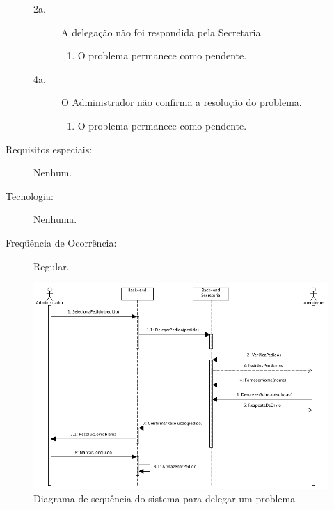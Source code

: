 \documentclass[brazil,times]{abnt}
\begin{document}
\begin{description}
\begin{description}
	\item[2a.] A delegação não foi respondida pela Secretaria.
	\begin{enumerate}
 		\item O problema permanece como pendente.
	\end{enumerate}
		
	\item[4a.] O Administrador não confirma a resolução do problema. 
	\begin{enumerate}
 		\item O problema permanece como pendente.
	\end{enumerate} 
\end{description}
\item[Requisitos especiais:] Nenhum.
\item[Tecnologia:] Nenhuma.
\item[Freqüência de Ocorrência:] Regular.
\end{description}
\newpage
\begin{figure}[htp]
\begin{center}
  \includegraphics[scale=0.65]{diagramas/diagramaDeSequenciaDelegar.png}
  \caption[Diagrama de sequência do sistema para delegar um
  problema]{Diagrama de sequência do sistema para delegar um
  problema}
  \label{diagrama-sequencia-delegar}
\end{center}
\end{figure}
\end{document}
